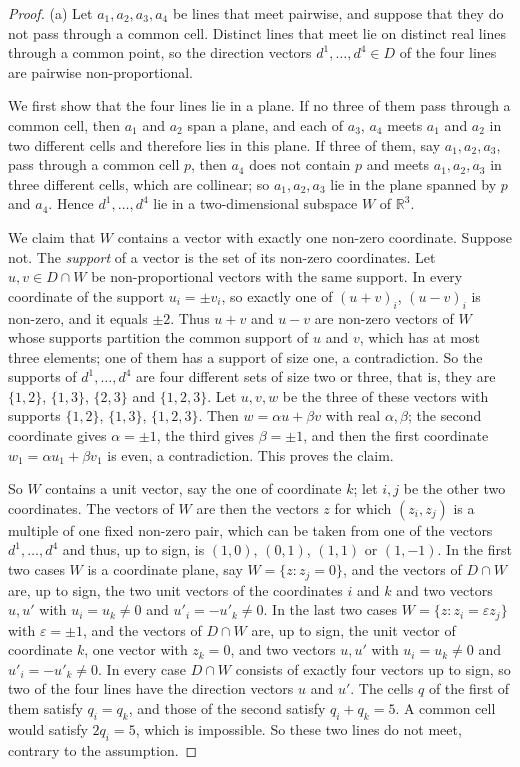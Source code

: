 \begin{proof}
(a) Let $a_1,a_2,a_3,a_4$ be lines that meet pairwise, and suppose that they do not pass through a common
cell. Distinct lines that meet lie on distinct real lines through a common point, so the direction vectors
$d^1,\dots,d^4\in D$ of the four lines are pairwise non-proportional.

We first show that the four lines lie in a plane. If no three of them pass through a common cell, then $a_1$
and $a_2$ span a plane, and each of $a_3$, $a_4$ meets $a_1$ and $a_2$ in two different cells and therefore
lies in this plane. If three of them, say $a_1,a_2,a_3$, pass through a common cell $p$, then $a_4$ does not
contain $p$ and meets $a_1,a_2,a_3$ in three different cells, which are collinear; so $a_1,a_2,a_3$ lie in the
plane spanned by $p$ and $a_4$. Hence $d^1,\dots,d^4$ lie in a two-dimensional subspace $W$ of $\mathbb{R}^3$.

We claim that $W$ contains a vector with exactly one non-zero coordinate. Suppose not. The \emph{support}
of a vector is the set of its non-zero coordinates. Let $u,v\in D\cap W$ be non-proportional vectors with
the same support. In every coordinate of the support $u_i=\pm v_i$, so exactly one of $(u+v)_i$, $(u-v)_i$
is non-zero, and it equals $\pm2$. Thus $u+v$ and $u-v$ are non-zero vectors of $W$ whose supports partition
the common support of $u$ and $v$, which has at most three elements; one of them has a support of size one, a
contradiction. So the supports of $d^1,\dots,d^4$ are four different sets of size two or three, that is, they
are $\{1,2\}$, $\{1,3\}$, $\{2,3\}$ and $\{1,2,3\}$. Let $u,v,w$ be the three of these vectors with supports
$\{1,2\}$, $\{1,3\}$, $\{1,2,3\}$. Then $w=\alpha u+\beta v$ with real $\alpha,\beta$; the second coordinate
gives $\alpha=\pm1$, the third gives $\beta=\pm1$, and then the first coordinate
$w_1=\alpha u_1+\beta v_1$ is even, a contradiction. This proves the claim.

So $W$ contains a unit vector, say the one of coordinate $k$; let $i,j$ be the other two coordinates. The
vectors of $W$ are then the vectors $z$ for which $(z_i,z_j)$ is a multiple of one fixed non-zero pair,
which can be taken from one of the vectors $d^1,\dots,d^4$ and thus, up to sign, is $(1,0)$, $(0,1)$,
$(1,1)$ or $(1,-1)$. In the first two cases $W$ is a coordinate plane, say $W=\{z: z_j=0\}$, and the vectors
of $D\cap W$ are, up to sign, the two unit vectors of the coordinates $i$ and $k$ and two vectors $u,u'$
with $u_i=u_k\ne0$ and $u'_i=-u'_k\ne0$. In the last two cases $W=\{z: z_i=\varepsilon z_j\}$ with
$\varepsilon=\pm1$, and the vectors of $D\cap W$ are, up to sign, the unit vector of coordinate $k$, one
vector with $z_k=0$, and two vectors $u,u'$ with $u_i=u_k\ne0$ and $u'_i=-u'_k\ne0$. In every case $D\cap W$
consists of exactly four vectors up to sign, so two of the four lines have the direction vectors $u$ and
$u'$. The cells $q$ of the first of them satisfy $q_i=q_k$, and those of the second satisfy $q_i+q_k=5$. A
common cell would satisfy $2q_i=5$, which is impossible. So these two lines do not meet, contrary to the
assumption.


\end{proof}
